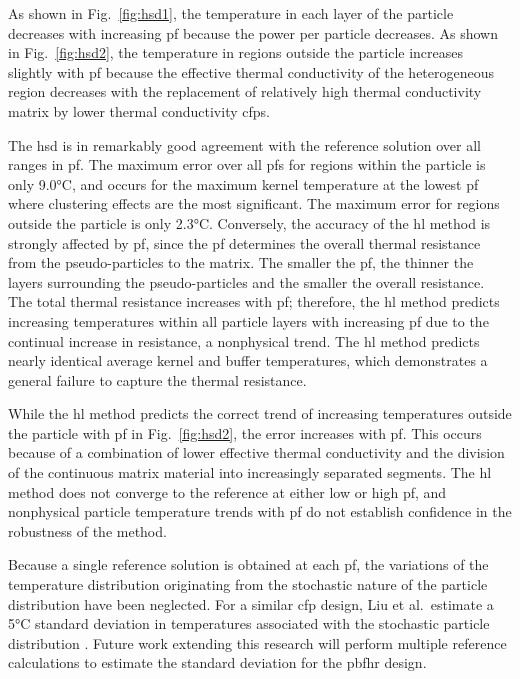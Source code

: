 As shown in Fig.\ \ref{fig:hsd1}, the temperature in each layer of the particle decreases with increasing \gls{pf} because the power per particle decreases. As shown in Fig.\ \ref{fig:hsd2}, the temperature in regions outside the particle increases slightly with \gls{pf} because the effective thermal conductivity of the heterogeneous region decreases with the replacement of relatively high thermal conductivity matrix by lower thermal conductivity \glspl{cfp}.

The \gls{hsd} is in remarkably good agreement with the reference solution over all ranges in \gls{pf}. The maximum error over all \glspl{pf} for regions within the particle is only 9.0\si{\celsius}, and occurs for the maximum kernel temperature at the lowest \gls{pf} where clustering effects are the most significant. The maximum error for regions outside the particle is only 2.3\si{\celsius}. Conversely, the accuracy of the \gls{hl} method is strongly affected by \gls{pf}, since the \gls{pf} determines the overall thermal resistance from the pseudo-particles to the matrix. The smaller the \gls{pf}, the thinner the layers surrounding the pseudo-particles and the smaller the overall resistance. The total thermal resistance increases with \gls{pf}; therefore, the \gls{hl} method predicts increasing temperatures within all particle layers with increasing \gls{pf} due to the continual increase in resistance, a nonphysical trend. The \gls{hl} method predicts nearly identical average kernel and buffer temperatures, which demonstrates a general failure to capture the thermal resistance.

While the \gls{hl} method predicts the correct trend of increasing temperatures outside the particle with \gls{pf} in Fig.\ \ref{fig:hsd2}, the error increases with \gls{pf}. This occurs because of a combination of lower effective thermal conductivity and the division of the continuous matrix material into increasingly separated segments. The \gls{hl} method does not converge to the reference at either low or high \gls{pf}, and nonphysical particle temperature trends with \gls{pf} do not establish confidence in the robustness of the method. 

Because a single reference solution is obtained at each \gls{pf}, the variations of the temperature distribution originating from the stochastic nature of the particle distribution have been neglected. For a similar \gls{cfp} design, Liu et al.\ estimate a 5\si{\celsius} standard deviation in temperatures associated with the stochastic particle distribution \cite{liu}. Future work extending this research will perform multiple reference calculations to estimate the standard deviation for the \gls{pbfhr} design.

